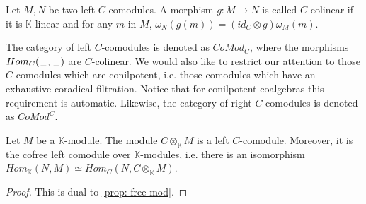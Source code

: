 \documentclass[../thesis.tex]{subfiles}
\begin{document}
\begin{definition}[Comodules]
\begin{center}
                \end{center}
            \end{definition}

            \begin{definition}
                Let $M,N$ be two left $C$-comodules. A morphism $g:M\rightarrow N$ is called $C$-colinear if it is $\mathbb{K}$-linear and for any $m$ in $M$, $\omega_N(g(m)) = (id_C\otimes g)\omega_M(m)$.
            \end{definition}

            The category of left $C$-comodules is denoted as $CoMod_C$, where the morphisms $Hom_C(\hspace{0.05cm}\underline{\hspace{0.2cm}}\hspace{0.05cm},\hspace{0.05cm}\underline{\hspace{0.2cm}}\hspace{0.05cm})$ are $C$-colinear. We would also like to restrict our attention to those $C$-comodules which are conilpotent, i.e. those comodules which have an exhaustive coradical filtration. Notice that for conilpotent coalgebras this requirement is automatic. Likewise, the category of right $C$-comodules is denoted as $CoMod^C$.

            \begin{proposition}\label{prop: cofree-comod}
                Let $M$ be a $\mathbb{K}$-module. The module $C\otimes_{\mathbb{K}}M$ is a left $C$-comodule. Moreover, it is the cofree left comodule over $\mathbb{K}$-modules, i.e. there is an isomorphism $Hom_{\mathbb{K}}(N,M)\simeq Hom_C(N,C\otimes_{\mathbb{K}}M)$. 
            \end{proposition}

            \begin{proof}
                This is dual to \ref{prop: free-mod}.
            \end{proof}
\end{document}
